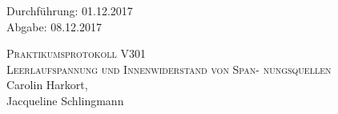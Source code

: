 

\begin{titlepage}
  \begin{flushleft}
 Durchführung: 01.12.2017\\
 Abgabe: 08.12.2017
  \end{flushleft}



 \begin{center}


\textsc{\LARGE Praktikumsprotokoll V301}\\[1.5cm]
\textsc{\huge Leerlaufspannung und Innenwiderstand von Span-
nungsquellen } \\[5,5cm]

Carolin Harkort\footnotemark[1], \\
Jacqueline Schlingmann\footnotemark[2] \\[1,0cm]



 \end{center}

 \vfill

\end{titlepage}


  
  

\nocite{*}
\printbibliography

